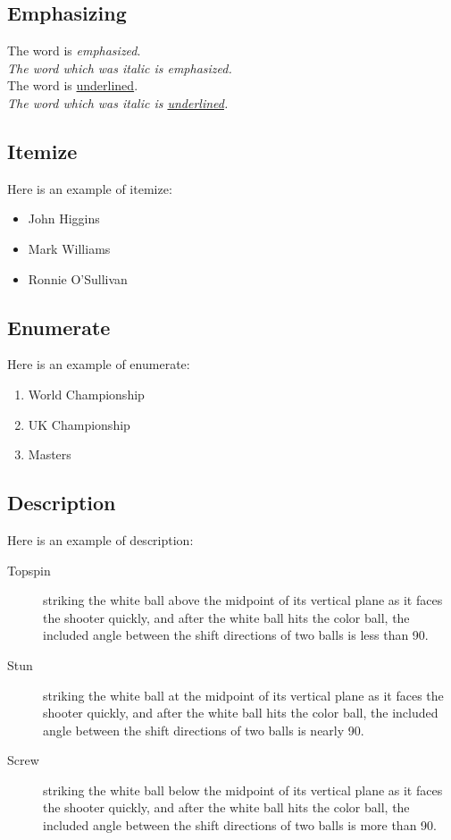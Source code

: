 \documentclass[a4paper,10pt]{article}
\begin{document}
    \subsection{Emphasizing}
    The word is \emph{emphasized}.\\
    \textit{The word which was italic is \emph{emphasized}.}\\
    The word is \uline{underlined}.\\
    \textit{The word which was italic is \uline{underlined}.}
    \subsection{Itemize}
    Here is an example of itemize:
    \begin{itemize}
        \item John Higgins
        \item Mark Williams
        \item Ronnie O'Sullivan
    \end{itemize}
    \subsection{Enumerate}
    Here is an example of enumerate:
    \begin{enumerate}
        \item World Championship
        \item UK Championship
        \item Masters
    \end{enumerate}
    \subsection{Description}
    Here is an example of description:
    \begin{description}
        \item[Topspin] striking the white ball above the midpoint of its
        vertical plane as it faces the shooter quickly, and after the white
        ball hits the color ball, the included angle between the shift
        directions of two balls is less than 90\textdegree{}.
        \item[Stun] striking the white ball at the midpoint of its vertical
        plane as it faces the shooter quickly, and after the white ball hits
        the color ball, the included angle between the shift directions of two
        balls is nearly 90\textdegree{}.
        \item[Screw] striking the white ball below the midpoint of its vertical
        plane as it faces the shooter quickly, and after the white ball hits
        the color ball, the included angle between the shift directions of two
        balls is more than 90\textdegree{}.
    \end{description}
\end{document}
